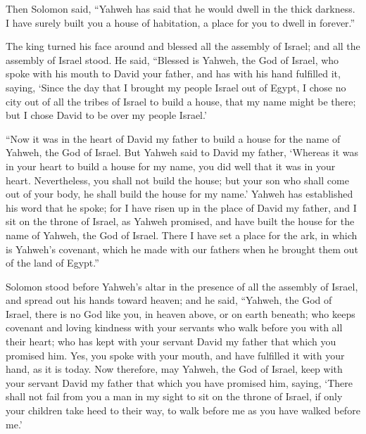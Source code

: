  Then Solomon said, ``Yahweh has said that he would dwell
in the thick darkness.  I have surely built you a house
of habitation, a place for you to dwell in forever.''

 The king turned his face around and blessed all the
assembly of Israel; and all the assembly of Israel stood.
 He said, ``Blessed is Yahweh, the God of Israel, who
spoke with his mouth to David your father, and has with his hand
fulfilled it, saying,  `Since the day that I brought my
people Israel out of Egypt, I chose no city out of all the tribes of
Israel to build a house, that my name might be there; but I chose David
to be over my people Israel.'

 ``Now it was in the heart of David my father to build a
house for the name of Yahweh, the God of Israel.  But
Yahweh said to David my father, `Whereas it was in your heart to build a
house for my name, you did well that it was in your heart.
 Nevertheless, you shall not build the house; but your
son who shall come out of your body, he shall build the house for my
name.'  Yahweh has established his word that he spoke;
for I have risen up in the place of David my father, and I sit on the
throne of Israel, as Yahweh promised, and have built the house for the
name of Yahweh, the God of Israel.  There I have set a
place for the ark, in which is Yahweh's covenant, which he made with our
fathers when he brought them out of the land of Egypt.''

 Solomon stood before Yahweh's altar in the presence of
all the assembly of Israel, and spread out his hands toward heaven;
 and he said, ``Yahweh, the God of Israel, there is no
God like you, in heaven above, or on earth beneath; who keeps covenant
and loving kindness with your servants who walk before you with all
their heart;  who has kept with your servant David my
father that which you promised him. Yes, you spoke with your mouth, and
have fulfilled it with your hand, as it is today.  Now
therefore, may Yahweh, the God of Israel, keep with your servant David
my father that which you have promised him, saying, `There shall not
fail from you a man in my sight to sit on the throne of Israel, if only
your children take heed to their way, to walk before me as you have
walked before me.'

